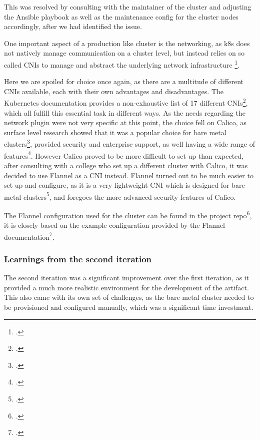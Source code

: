 This was resolved by consulting with the maintainer of the cluster and adjusting the Ansible playbook as well as the maintenance config for the cluster nodes accordingly, 
after we had identified the issue.


One important aspect of a production like cluster is the networking, as \ac{k8s} does not natively manage communication on a cluster level,
but instead relies on so called \ac{CNI}s to manage and abstract the underlying network infrastructure \footcite{ClusterNetworking}.

Here we are spoiled for choice once again, as there are a multitude of different \ac{CNI}s available, each with their own advantages and disadvantages.
The Kubernetes documentation provides a non-exhaustive list of 17 different \ac{CNI}s\footcite{KubernetesCNIPlugins}, which all fulfill this essential task in different ways.
As the needs regarding the network plugin were not very specific at this point, the choice fell on Calico, as surface level research showed that it was a popular choice for bare metal clusters\footcite{ExploreNetworkPlugins},
provided security and enterprise support, as well having a wide range of features\footcite{mehndirattaComparingKubernetesContainer}.
However Calico proved to be more difficult to set up than expected, after consulting with a college who set up a different cluster with Calico,
it was decided to use Flannel as a \ac{CNI} instead.
Flannel turned out to be much easier to set up and configure, as it is a very lightweight \ac{CNI} which is designed for bare metal clusters\footcite{Flannel2023}, 
and foregoes the more advanced security features of Calico. 

The Flannel configuration used for the cluster can be found in the project repo\footcite{eckerthProjectRepoFlannel}, it is closely based on the example configuration provided by the Flannel documentation\footcite{FlannelInstallConfig}.

\subsubsection*{Learnings from the second iteration}

The second iteration was a significant improvement over the first iteration, as it provided a much more realistic environment for the development of the artifact.
This also came with its own set of challenges, as the bare metal cluster needed to be provisioned and configured manually, which was a significant time investment.

